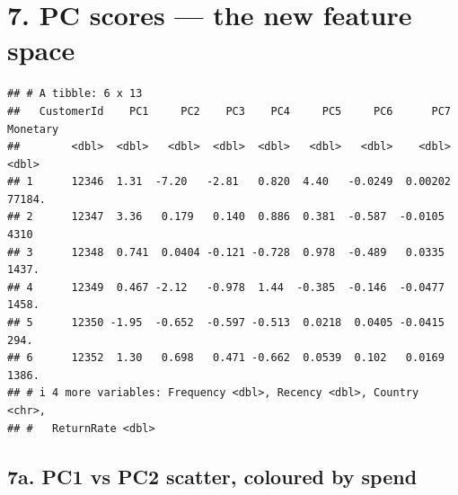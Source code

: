 \documentclass[
]{article}
\newenvironment{Shaded}{\begin{snugshade}}{\end{snugshade}}
\newcommand{\AttributeTok}[1]{\textcolor[rgb]{0.13,0.29,0.53}{#1}}
\newcommand{\DecValTok}[1]{\textcolor[rgb]{0.00,0.00,0.81}{#1}}
\newcommand{\FunctionTok}[1]{\textcolor[rgb]{0.13,0.29,0.53}{\textbf{#1}}}
\newcommand{\NormalTok}[1]{#1}
\newcommand{\OtherTok}[1]{\textcolor[rgb]{0.56,0.35,0.01}{#1}}
\newcommand{\SpecialCharTok}[1]{\textcolor[rgb]{0.81,0.36,0.00}{\textbf{#1}}}
\newcommand{\StringTok}[1]{\textcolor[rgb]{0.31,0.60,0.02}{#1}}
\begin{document}
\section{7. PC scores --- the new feature
space}\label{pc-scores-the-new-feature-space}

\begin{Shaded}
\end{Shaded}

\begin{verbatim}
## # A tibble: 6 x 13
##   CustomerId    PC1     PC2    PC3    PC4     PC5     PC6      PC7 Monetary
##        <dbl>  <dbl>   <dbl>  <dbl>  <dbl>   <dbl>   <dbl>    <dbl>    <dbl>
## 1      12346  1.31  -7.20   -2.81   0.820  4.40   -0.0249  0.00202   77184.
## 2      12347  3.36   0.179   0.140  0.886  0.381  -0.587  -0.0105     4310 
## 3      12348  0.741  0.0404 -0.121 -0.728  0.978  -0.489   0.0335     1437.
## 4      12349  0.467 -2.12   -0.978  1.44  -0.385  -0.146  -0.0477     1458.
## 5      12350 -1.95  -0.652  -0.597 -0.513  0.0218  0.0405 -0.0415      294.
## 6      12352  1.30   0.698   0.471 -0.662  0.0539  0.102   0.0169     1386.
## # i 4 more variables: Frequency <dbl>, Recency <dbl>, Country <chr>,
## #   ReturnRate <dbl>
\end{verbatim}

\subsection{7a. PC1 vs PC2 scatter, coloured by
spend}\label{a.-pc1-vs-pc2-scatter-coloured-by-spend}
\end{document}

